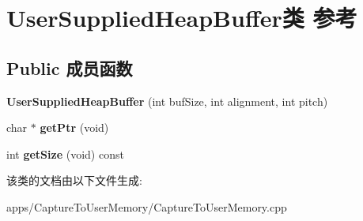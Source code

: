 \hypertarget{class_user_supplied_heap_buffer}{\section{User\+Supplied\+Heap\+Buffer类 参考}
\label{class_user_supplied_heap_buffer}
}
\subsection*{Public 成员函数}
\begin{DoxyCompactItemize}
\item 
\hypertarget{class_user_supplied_heap_buffer_a0c79f6a45cf5ed6ee0556b7487ec3eff}{{\bfseries User\+Supplied\+Heap\+Buffer} (int buf\+Size, int alignment, int pitch)}\label{class_user_supplied_heap_buffer_a0c79f6a45cf5ed6ee0556b7487ec3eff}

\item 
\hypertarget{class_user_supplied_heap_buffer_a58660fc423c601d6af6845d3707a4f8c}{char $\ast$ {\bfseries get\+Ptr} (void)}\label{class_user_supplied_heap_buffer_a58660fc423c601d6af6845d3707a4f8c}

\item 
\hypertarget{class_user_supplied_heap_buffer_aebada535c69310036a3bfb2c44c4b21e}{int {\bfseries get\+Size} (void) const }\label{class_user_supplied_heap_buffer_aebada535c69310036a3bfb2c44c4b21e}

\end{DoxyCompactItemize}


该类的文档由以下文件生成\+:\begin{DoxyCompactItemize}
\item 
apps/\+Capture\+To\+User\+Memory/Capture\+To\+User\+Memory.\+cpp\end{DoxyCompactItemize}
